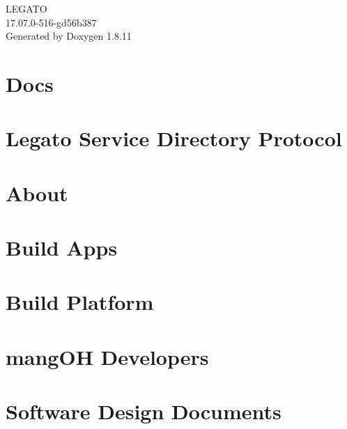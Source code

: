 \documentclass[twoside]{book}
\newcommand{\+}{\discretionary{\mbox{\scriptsize$\hookleftarrow$}}{}{}}
\newcommand{\clearemptydoublepage}{%
  \newpage{\pagestyle{empty}\cleardoublepage}%
}
\begin{document}
\hypersetup{pageanchor=false,
             bookmarksnumbered=true,
             pdfencoding=unicode
            }
\begin{titlepage}
\vspace*{7cm}
\begin{center}%
{\Large L\+E\+G\+A\+TO \\[1ex]\large 17.\+07.\+0-\/516-\/gd56b387 }\\
\vspace*{1cm}
{\large Generated by Doxygen 1.8.11}\\
\end{center}
\end{titlepage}
\clearemptydoublepage
\tableofcontents
\clearemptydoublepage
{}
\hypersetup{pageanchor=true}

\chapter{Docs}
\label{index}\hypertarget{index}{}
\chapter{Legato Service Directory Protocol}
\label{serviceDirectoryProtocol}
\hypertarget{serviceDirectoryProtocol}{}

\chapter{About}
\label{aboutMain}
\hypertarget{aboutMain}{}

\chapter{Build Apps}
\label{buildAppsMain}
\hypertarget{buildAppsMain}{}

\chapter{Build Platform}
\label{buildPlatformMain}
\hypertarget{buildPlatformMain}{}

\chapter{mang\+OH Developers}
\label{mangohDevelopers}
\hypertarget{mangohDevelopers}{}

\chapter{Software Design Documents}
\label{c_sdd}
\hypertarget{c_sdd}{}

\end{document}
